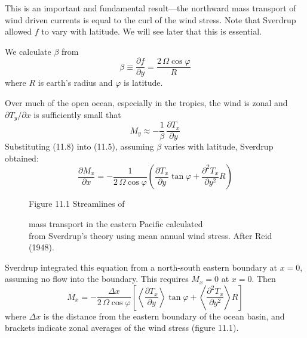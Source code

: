 This is an important and fundamental result---the northward mass
transport of wind driven currents is equal
to the curl of the wind stress. Note that Sverdrup allowed $f$ to vary
with latitude. We will see later that this is essential.

We calculate $\beta $ from
\begin{equation}
\beta \equiv \frac{\partial{f}}{\partial{y}} = \frac{2\,\Omega\cos\varphi}{R}
\end{equation}
where $R$ is earth's radius and $\varphi$ is latitude.

Over much of the open ocean, especially in the tropics, the wind is
zonal and $\partial{T_y}/\partial{x}$ is sufficiently small that
\begin{equation}
M_y \approx -\frac{1}{\beta}\,\frac{\partial T_x}{\partial y}
\end{equation}
Substituting (11.8) into (11.5), assuming $\beta$ varies with
latitude, Sverdrup obtained:
\begin{equation}
\frac{\partial{M_x}}{\partial{x}}=-
\frac{1}{2\,\Omega\cos\varphi}\left(\frac{\partial{T_x}}{\partial{y}}\tan\varphi +
\frac{\partial^2{T_x}}{\partial{y}^2}R \right)
\end{equation}


\begin{figure}[t!]
\centering
\footnotesize
Figure 11.1 Streamlines of \rule{0mm}{3ex}mass
transport in the eastern Pacific
calculated\\from Sverdrup's theory using mean annual wind
stress. After Reid (1948).

\label{fig:sverdrupmap}
\vspace{-3ex}
\end{figure}

Sverdrup integrated this equation from a north-south eastern boundary
at $ x = 0$, assuming no flow into the boundary. This requires $M_x = 0$
at $x = 0$. Then
\begin{equation}
M_x =- \frac{\Delta{x}}{2\,\Omega\cos\varphi}\left[ \left<
\frac{\partial{T_x}}{\partial{y}}\right > \tan\varphi +
\left< \frac{\partial^2{T_x}}{\partial{y}^2} \right> R \right]
\end{equation}
where $\Delta x$ is the distance from the eastern boundary of the
ocean basin, and brackets indicate zonal averages of the wind
stress (figure 11.1).

